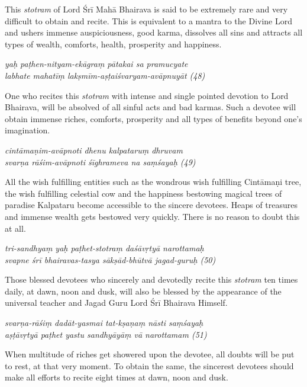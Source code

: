 \documentclass[12pt,oneside,a4paper]{article}
\newenvironment{shloka}[1]
  {\bigskip\center#1\varwidth{\linewidth}}
  {\endvarwidth\endcenter\bigskip}
\newcommand{\tl}[1]{\emph{#1}}
\begin{document}
This \tl{stotram} of Lord Śrī Mahā Bhairava is said to be extremely rare and
very difficult to obtain and recite. This is equivalent to a mantra to
the Divine Lord and ushers immense auspiciousness, good karma, dissolves all
sins and attracts all types of wealth, comforts, health, prosperity and
happiness.

\begin{shloka}\itshape
  yaḥ paṭhen-nityam-ekāgraṃ pātakai sa pramucyate\\
  labhate mahatīṃ lakṣmīm-aṣṭaiśvaryam-avāpnuyāt (48)
\end{shloka}

One who recites this \tl{stotram} with intense and single pointed devotion to
Lord Bhairava, will be absolved of all sinful acts and bad karmas. Such
a devotee will obtain immense riches, comforts, prosperity and all types of
benefits beyond one’s imagination.

\begin{shloka}\itshape
  cintāmaṇim-avāpnoti dhenu kalpataruṃ dhruvam\\
  svarṇa rāśim-avāpnoti śīghrameva na saṃśayaḥ (49)
\end{shloka}

All the wish fulfilling entities such as the wondrous wish fulfilling Cintāmaṇi
tree, the wish fulfilling celestial cow and the happiness bestowing magical
trees of paradise Kalpataru become accessible to the sincere devotees. Heaps of
treasures and immense wealth gets bestowed very quickly. There is no reason to
doubt this at all.

\begin{shloka}\itshape
  tri-sandhyaṃ yaḥ paṭhet-stotraṃ daśāvṛtyā narottamaḥ\\
  svapne śrī bhairavas-tasya sākṣād-bhūtvā jagad-guruḥ (50)
\end{shloka}

Those blessed devotees who sincerely and devotedly recite this \tl{stotram} ten
times daily, at dawn, noon and dusk, will also be blessed by the appearance of
the universal teacher and Jagad Guru Lord Śrī Bhairava Himself.

\begin{shloka}\itshape
  svarṇa-rāśiṃ dadāt-yasmai tat-kṣaṇaṃ nāsti saṃśayaḥ\\
  aṣṭāvṛtyā paṭhet yastu sandhyāyāṃ vā narottamam (51)
\end{shloka}

When multitude of riches get showered upon the devotee, all doubts will be put
to rest, at that very moment. To obtain the same, the sincerest devotees should
make all efforts to recite eight times at dawn, noon and dusk.
\end{document}
